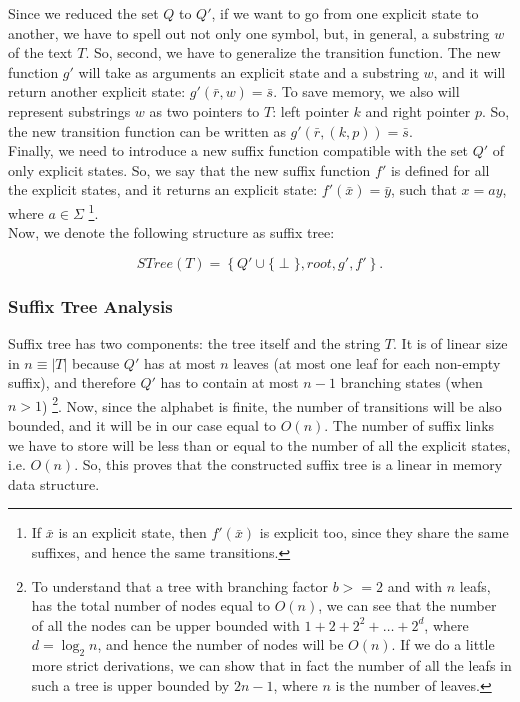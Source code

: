 \documentclass[paper=a4, fontsize=11pt]{scrartcl} %
\numberwithin{equation}{section} %
\numberwithin{figure}{section} %
\numberwithin{table}{section} %
\begin{document}
Since we reduced the set $Q$ to $Q'$, if we want to go from one explicit state to another, we have to spell out not only one symbol, but, in general, a substring $w$ of the text $T$. So, second, we have to generalize the transition function. The new function $g'$ will take as arguments an explicit state and a substring $w$, and it will return another explicit state: $g'(\bar{r}, w) = \bar{s}$. To save memory, we also will represent substrings $w$ as two pointers to $T$: left pointer $k$ and right pointer $p$. So, the new transition function can be written as $g'(\bar{r},(k,p)) = \bar{s}$.\\

Finally, we need to introduce a new suffix function compatible with the set $Q'$ of only explicit states. So, we say that the new suffix function $f'$ is defined for all the explicit states, and it returns an explicit state: $f'(\bar{x}) = \bar{y}$, such that $x = ay$, where $a \in \Sigma$ \footnote{If $\bar{x}$ is an explicit state, then $f'(\bar{x})$ is explicit too, since they share the same suffixes, and hence the same transitions.}.\\

Now, we denote the following structure as suffix tree:

\begin{equation}
STree(T) = \left\{ Q' \cup \{\perp\}, root, g', f' \right\}.
\end{equation}

\subsubsection{Suffix Tree Analysis}
Suffix tree has two components: the tree itself and the string $T$. It is of linear size in $n \equiv |T|$ because $Q'$ has at most $n$ leaves (at most one leaf for each non-empty suffix), and therefore $Q'$ has to contain at most $n - 1$ branching states (when $n > 1$) \footnote{To understand that a tree with branching factor $b >= 2$ and with $n$ leafs, has the total number of nodes equal to $O(n)$, we can see that the number of all the nodes can be upper bounded with $1 + 2 + 2^2 + \dots + 2^d$, where $d = \log_2n$, and hence the number of nodes will be $O(n)$. If we do a little more strict derivations, we can show that in fact the number of all the leafs in such a tree is upper bounded by $2n - 1$, where $n$ is the number of leaves.}. Now, since the alphabet is finite, the number of transitions will be also bounded, and it will be in our case equal to $O(n)$. The number of suffix links we have to store will be less than or equal to the number of all the explicit states, i.e. $O(n)$. So, this proves that the constructed suffix tree is a linear in memory data structure.
\end{document}
